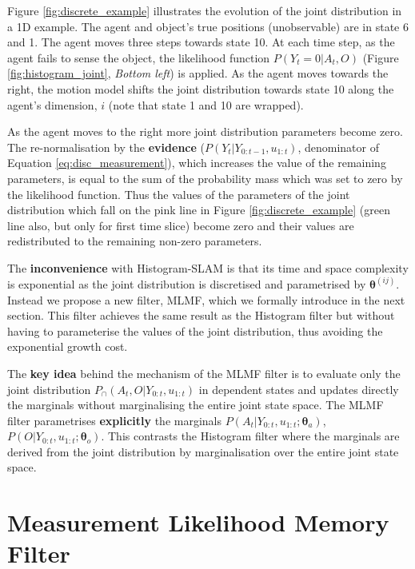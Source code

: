\documentclass{frontiersSCNS} %
\newcommand{\ThA}{\boldsymbol{\theta}_a}
\newcommand{\ThO}{\boldsymbol{\theta}_o}
\begin{document}
Figure \ref{fig:discrete_example} illustrates the evolution of the joint distribution in a 1D example. 
The agent and object's true positions (unobservable) are in state 6 and 1. The agent moves three steps towards state 10. At each time 
step, as the agent fails to sense the object, the likelihood function  $P(Y_t=0|A_t,O)$ (Figure \ref{fig:histogram_joint}, \textit{Bottom left})
is applied. As the agent moves towards the right, the motion model shifts the joint distribution towards state 10 along the agent's 
dimension, $i$ (note that state 1 and 10 are wrapped).


As the agent moves to the right more joint distribution parameters become zero. The re-normalisation by the \textbf{evidence} ($P(Y_t|Y_{0:t-1},u_{1:t})$, denominator of Equation \ref{eq:disc_measurement}), 
which increases the value of the remaining parameters, is equal to the sum of the probability mass which was set to zero by the likelihood function.
Thus the values of the parameters of the joint distribution which fall on the pink line in Figure \ref{fig:discrete_example} 
(green line also, but only for first time slice) become zero and their values are redistributed to the remaining non-zero parameters. 

The \textbf{inconvenience} with Histogram-SLAM is that its time and space complexity is exponential as the joint distribution is discretised and 
parametrised by $\boldsymbol{\theta}^{(ij)}$. Instead we propose a new filter, MLMF, which we formally introduce in the next section. This filter
achieves the same result as the Histogram filter but without having to parameterise the values of the joint distribution, thus avoiding the exponential growth cost. 

The \textbf{key idea} behind the mechanism of the MLMF filter is to evaluate only the joint distribution $P_{\cap}(A_t,O|Y_{0:t},u_{1:t})$ in
dependent states and updates directly the marginals without marginalising the entire joint state space.
The MLMF filter parametrises \textbf{explicitly} the marginals ${P(A_t|Y_{0:t},u_{1:t};\ThA)}$, ${P(O|Y_{0:t},u_{1:t};\ThO)}$. 
This contrasts the Histogram filter where the marginals are derived from the joint distribution by marginalisation over the entire joint state space. 

\section{Measurement Likelihood Memory Filter}\label{sec:MLMF}
 
\end{document}
